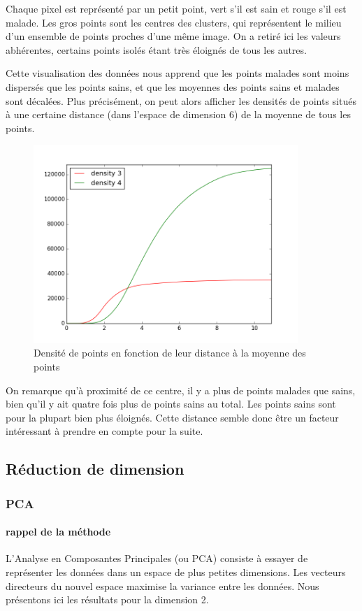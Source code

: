 \documentclass[a4paper,10pt]{report}
\begin{document}
Chaque pixel est représenté par un petit point, vert s'il est sain et rouge s'il est malade. Les gros points sont les centres des clusters, qui représentent le milieu d'un ensemble de points proches d'une même image. On a retiré ici les valeurs abhérentes, certains points isolés étant très éloignés de tous les autres.


Cette visualisation des données nous apprend que les points malades sont moins dispersés que les points sains, et que les moyennes des points sains et malades sont décalées.
Plus précisément, on peut alors afficher les densités de points situés à une certaine distance (dans l'espace de dimension 6) de la moyenne de tous les points.

\begin{figure}[htbp]
  \caption{Densité de points en fonction de leur distance à la moyenne des points}
  \centering
  \includegraphics[width=10cm]{density.png}
\end{figure}

On remarque qu'à proximité de ce centre, il y a plus de points malades que sains, bien qu'il y ait quatre fois plus de points sains au total. Les points sains sont pour la plupart bien plus éloignés. Cette distance semble donc être un facteur intéressant à prendre en compte pour la suite.


\subsection{Réduction de dimension}
\subsubsection{PCA}
\paragraph{rappel de la méthode }
L'Analyse en Composantes Principales (ou PCA) consiste à essayer de représenter les données dans un espace de plus petites dimensions. Les vecteurs directeurs du nouvel espace maximise la variance entre les données. Nous présentons ici les résultats pour la dimension 2.
\end{document}
